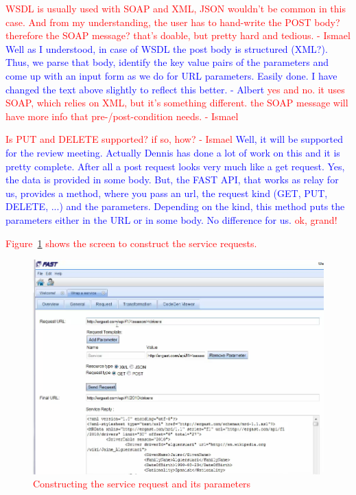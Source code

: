\documentclass{fast_latex}
\begin{document}
\textcolor{red}{WSDL is usually used with SOAP and XML, JSON wouldn't be common in this case. And from my understanding, the user has to hand-write the POST body? therefore the SOAP message? that's doable, but pretty hard and tedious. - Ismael
\textcolor{blue}{Well as I understood, in case of WSDL the post body is structured (XML?). Thus, we parse that body, identify the key value pairs of the parameters and come up with an input form as we do for URL parameters. Easily done. 
I have changed the text above slightly to reflect this better. - Albert}
\textcolor{red}{yes and no. it uses SOAP, which relies on XML, but it's something different. the SOAP message will have more info that pre-/post-condition needs. - Ismael}


\textcolor{red}{Is PUT and DELETE supported? if so, how? - Ismael}
\textcolor{blue}{Well, it will be supported for the review meeting. Actually Dennis has done a lot of work on this and it is pretty complete. 
After all a post request looks very much like a get request. Yes, the data is provided in some body. But, the FAST API, that works as relay for us, provides a method, where you pass an url, the request kind (GET, PUT, DELETE, ...) and the parameters. Depending on the kind, this method puts the parameters either in the URL or in some body. No difference for us.}
\textcolor{red}{ok, grand!}

Figure~\ref{fig:construct_service_request} shows the screen to construct the service requests.

\begin{figure}
  \begin{center}
    \includegraphics[width=\linewidth]{images/ServiceWrapperToolGVSRequestTemplate.png}
    \caption{Constructing the service request and its parameters}
    \label{fig:construct_service_request}
  \end{center}
\end{figure}


}
\end{document}
